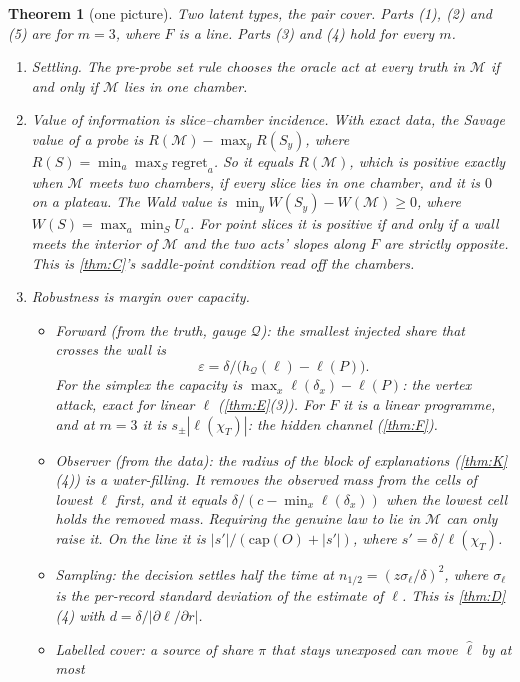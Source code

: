 \documentclass[11pt]{article}
\newtheorem{theorem}{Theorem}\renewcommand{\thetheorem}{\Alph{theorem}}
\theoremstyle{definition}\newtheorem{definition}{Definition}\newtheorem{remark}{Remark}
\begin{document}
\begin{theorem}[one picture]\label{thm:L}
Two latent types, the pair cover. Parts (1), (2) and (5) are for $m=3$, where $F$ is a line. Parts (3) and (4) hold for every $m$.
\begin{enumerate}
\item[(1)] \emph{Settling.} The pre-probe set rule chooses the oracle act at every truth in $\mathcal M$ if and only if $\mathcal M$ lies in
  one chamber.
\item[(2)] \emph{Value of information is slice--chamber incidence.} With exact data, the Savage value of a probe is
  $R(\mathcal M)-\max_yR(S_y)$, where $R(S)=\min_a\max_S\text{regret}_a$. So it equals $R(\mathcal M)$, which is positive exactly when
  $\mathcal M$ meets two chambers, if every slice lies in one chamber, and it is $0$ on a plateau. The Wald value is
  $\min_yW(S_y)-W(\mathcal M)\ge0$, where $W(S)=\max_a\min_SU_a$. For point slices it is positive \emph{if and only if} a wall
  meets the interior of $\mathcal M$ and the two acts' slopes along $F$ are strictly opposite. This is \cref{thm:C}'s saddle-point
  condition read off the chambers.
\item[(3)] \emph{Robustness is margin over capacity.}
  \begin{itemize}
  \item[(a)] \emph{Forward} (from the truth, gauge $\mathcal Q$): the smallest injected share that crosses the wall is
    \[
    \varepsilon=\delta\big/\bigl(h_{\mathcal Q}(\ell)-\ell(P)\bigr).
    \]
    For the simplex the capacity is $\max_x\ell(\delta_x)-\ell(P)$: the vertex attack, exact for linear $\ell$ (\cref{thm:E}(3)). For
    $F$ it is a linear programme, and at $m=3$ it is $s_\pm|\ell(\chi_T)|$: the hidden channel (\cref{thm:F}).
  \item[(b)] \emph{Observer} (from the data): the radius of the block of explanations (\cref{thm:K}(4)) is a water-filling. It removes
    the observed mass from the cells of lowest $\ell$ first, and it equals $\delta/(c-\min_x\ell(\delta_x))$ when the lowest cell holds
    the removed mass. Requiring the genuine law to lie in $\mathcal M$ can only raise it. On the line it is
    $|s'|/(\mathrm{cap}(O)+|s'|)$, where $s'=\delta/\ell(\chi_T)$.
  \item[(c)] \emph{Sampling}: the decision settles half the time at $n_{1/2}=(z\sigma_\ell/\delta)^2$, where $\sigma_\ell$ is the
    per-record standard deviation of the estimate of $\ell$. This is \cref{thm:D}(4) with $d=\delta/|\partial\ell/\partial r|$.
  \item[(d)] \emph{Labelled cover}: a source of share $\pi$ that stays unexposed can move $\hat\ell$ by at most

\end{itemize}
\end{enumerate}
\end{theorem}
\end{document}
